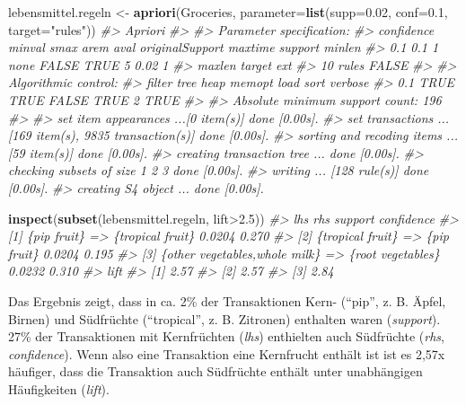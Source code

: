 \documentclass[12pt,]{book}
\newenvironment{Shaded}{\begin{snugshade}}{\end{snugshade}}
\newcommand{\KeywordTok}[1]{\textcolor[rgb]{0.13,0.29,0.53}{\textbf{{#1}}}}
\newcommand{\DataTypeTok}[1]{\textcolor[rgb]{0.13,0.29,0.53}{{#1}}}
\newcommand{\FloatTok}[1]{\textcolor[rgb]{0.00,0.00,0.81}{{#1}}}
\newcommand{\StringTok}[1]{\textcolor[rgb]{0.31,0.60,0.02}{{#1}}}
\newcommand{\CommentTok}[1]{\textcolor[rgb]{0.56,0.35,0.01}{\textit{{#1}}}}
\newcommand{\NormalTok}[1]{{#1}}
\begin{document}
\begin{Shaded}
\begin{Highlighting}[]
\NormalTok{lebensmittel.regeln <-}\StringTok{ }\KeywordTok{apriori}\NormalTok{(Groceries, }
                               \DataTypeTok{parameter=}\KeywordTok{list}\NormalTok{(}\DataTypeTok{supp=}\FloatTok{0.02}\NormalTok{, }\DataTypeTok{conf=}\FloatTok{0.1}\NormalTok{,}
                                              \DataTypeTok{target=}\StringTok{"rules"}\NormalTok{))}
\CommentTok{#> Apriori}
\CommentTok{#> }
\CommentTok{#> Parameter specification:}
\CommentTok{#>  confidence minval smax arem  aval originalSupport maxtime support minlen}
\CommentTok{#>         0.1    0.1    1 none FALSE            TRUE       5    0.02      1}
\CommentTok{#>  maxlen target   ext}
\CommentTok{#>      10  rules FALSE}
\CommentTok{#> }
\CommentTok{#> Algorithmic control:}
\CommentTok{#>  filter tree heap memopt load sort verbose}
\CommentTok{#>     0.1 TRUE TRUE  FALSE TRUE    2    TRUE}
\CommentTok{#> }
\CommentTok{#> Absolute minimum support count: 196 }
\CommentTok{#> }
\CommentTok{#> set item appearances ...[0 item(s)] done [0.00s].}
\CommentTok{#> set transactions ...[169 item(s), 9835 transaction(s)] done [0.00s].}
\CommentTok{#> sorting and recoding items ... [59 item(s)] done [0.00s].}
\CommentTok{#> creating transaction tree ... done [0.00s].}
\CommentTok{#> checking subsets of size 1 2 3 done [0.00s].}
\CommentTok{#> writing ... [128 rule(s)] done [0.00s].}
\CommentTok{#> creating S4 object  ... done [0.00s].}
\end{Highlighting}
\end{Shaded}

\begin{Shaded}
\begin{Highlighting}[]
\KeywordTok{inspect}\NormalTok{(}\KeywordTok{subset}\NormalTok{(lebensmittel.regeln, lift>}\FloatTok{2.5}\NormalTok{))}
\CommentTok{#>     lhs                              rhs               support confidence}
\CommentTok{#> [1] \{pip fruit\}                   => \{tropical fruit\}  0.0204  0.270     }
\CommentTok{#> [2] \{tropical fruit\}              => \{pip fruit\}       0.0204  0.195     }
\CommentTok{#> [3] \{other vegetables,whole milk\} => \{root vegetables\} 0.0232  0.310     }
\CommentTok{#>     lift}
\CommentTok{#> [1] 2.57}
\CommentTok{#> [2] 2.57}
\CommentTok{#> [3] 2.84}
\end{Highlighting}
\end{Shaded}

Das Ergebnis zeigt, dass in ca. 2\% der Transaktionen Kern- (``pip'', z.
B. Äpfel, Birnen) und Südfrüchte (``tropical'', z. B. Zitronen)
enthalten waren (\emph{support}). 27\% der Transaktionen mit
Kernfrüchten (\emph{lhs}) enthielten auch Südfrüchte (\emph{rhs},
\emph{confidence}). Wenn also eine Transaktion eine Kernfrucht enthält
ist ist es 2,57x häufiger, dass die Transaktion auch Südfrüchte enthält
unter unabhängigen Häufigkeiten (\emph{lift}).
\end{document}
